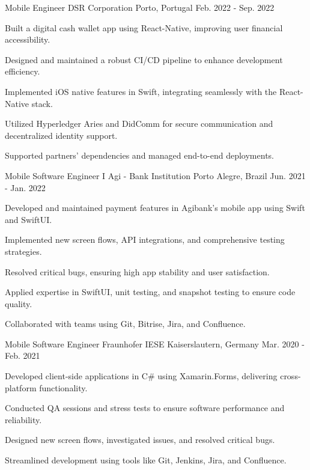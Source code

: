 \begin{cventries}
  \cventry
      {Mobile Engineer} %
      {DSR Corporation} %
      {Porto, Portugal} %
      {Feb. 2022 - Sep. 2022} %
      {
      \begin{cvitems} %
        \item {Built a digital cash wallet app using React-Native, improving user financial accessibility.}
        \item {Designed and maintained a robust CI/CD pipeline to enhance development efficiency.}
        \item {Implemented iOS native features in Swift, integrating seamlessly with the React-Native stack.}
        \item {Utilized Hyperledger Aries and DidComm for secure communication and decentralized identity support.}
        \item {Supported partners' dependencies and managed end-to-end deployments.}
      \end{cvitems}
      }

  \cventry
      {Mobile Software Engineer I} %
      {Agi - Bank Institution} %
      {Porto Alegre, Brazil} %
      {Jun. 2021 - Jan. 2022} %
      {
      \begin{cvitems} %
        \item {Developed and maintained payment features in Agibank's mobile app using Swift and SwiftUI.}
        \item {Implemented new screen flows, API integrations, and comprehensive testing strategies.}
        \item {Resolved critical bugs, ensuring high app stability and user satisfaction.}
        \item {Applied expertise in SwiftUI, unit testing, and snapshot testing to ensure code quality.}
        \item {Collaborated with teams using Git, Bitrise, Jira, and Confluence.}
      \end{cvitems}
      }

  \cventry
      {Mobile Software Engineer} %
      {Fraunhofer IESE} %
      {Kaiserslautern, Germany} %
      {Mar. 2020 - Feb. 2021} %
      {
      \begin{cvitems} %
        \item {Developed client-side applications in C\# using Xamarin.Forms, delivering cross-platform functionality.}
        \item {Conducted QA sessions and stress tests to ensure software performance and reliability.}
        \item {Designed new screen flows, investigated issues, and resolved critical bugs.}
        \item {Streamlined development using tools like Git, Jenkins, Jira, and Confluence.}
      \end{cvitems}
    }


\end{cventries}
